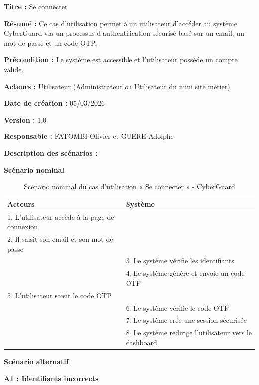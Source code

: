 \documentclass[a4paper,12pt]{report}
\begin{document}
    \textbf{Titre :} Se connecter
       
    \textbf{Résumé :}  
    Ce cas d’utilisation permet à un utilisateur d’accéder au système CyberGuard via un processus d’authentification sécurisé basé sur un email, un mot de passe et un code OTP.
     
    \textbf{Précondition :}  
    Le système est accessible et l’utilisateur possède un compte valide.  
    
    \textbf{Acteurs :}  
    Utilisateur (Administrateur ou Utilisateur du mini site métier)
       
    \textbf{Date de création :} 05/03/2026
    
    \textbf{Version :} 1.0
    
    \textbf{Responsable :} FATOMBI Olivier et GUERE Adolphe
    
    \textbf{Description des scénarios :}
    
    \textbf{Scénario nominal}
    
    \begin{table}[H]
        \centering
        \begin{tabular}{|p{6cm}|p{6cm}|}
            \hline
            \textbf{Acteurs} & \textbf{Système} \\
            \hline
            1. L’utilisateur accède à la page de connexion & \\
            2. Il saisit son email et son mot de passe & \\
            \hline
            & 3. Le système vérifie les identifiants \\
            & 4. Le système génère et envoie un code OTP \\
            \hline
            5. L’utilisateur saisit le code OTP & \\
            \hline
            & 6. Le système vérifie le code OTP \\
            & 7. Le système crée une session sécurisée \\
            & 8. Le système redirige l’utilisateur vers le dashboard \\
            \hline
        \end{tabular}
        \caption{Scénario nominal du cas d’utilisation « Se connecter » - CyberGuard}
    \end{table}
    
    \textbf{Scénario alternatif}
    
    \textbf{A1 : Identifiants incorrects}
    
\end{document}
